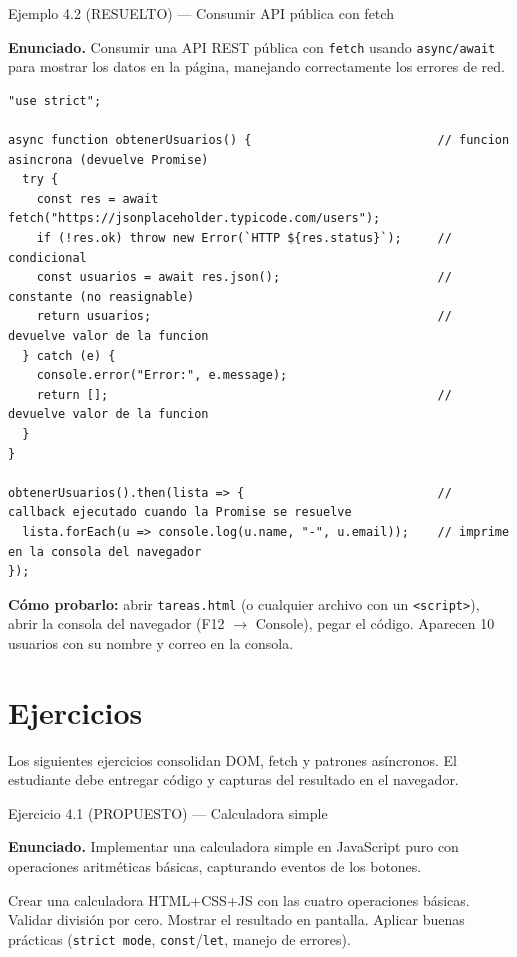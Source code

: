 \begin{cajaejemplo}{Ejemplo 4.2 (RESUELTO) --- Consumir API pública con fetch}

\textbf{Enunciado.} Consumir una API REST pública con \texttt{fetch} usando \texttt{async/await} para mostrar los datos en la página, manejando correctamente los errores de red.

\begin{lstlisting}[style=js,caption={api.js},label=lst:4.6]
"use strict";

async function obtenerUsuarios() {                          // funcion asincrona (devuelve Promise)
  try {
    const res = await fetch("https://jsonplaceholder.typicode.com/users");
    if (!res.ok) throw new Error(`HTTP ${res.status}`);     // condicional
    const usuarios = await res.json();                      // constante (no reasignable)
    return usuarios;                                        // devuelve valor de la funcion
  } catch (e) {
    console.error("Error:", e.message);
    return [];                                              // devuelve valor de la funcion
  }
}

obtenerUsuarios().then(lista => {                           // callback ejecutado cuando la Promise se resuelve
  lista.forEach(u => console.log(u.name, "-", u.email));    // imprime en la consola del navegador
});
\end{lstlisting}

\textbf{Cómo probarlo:} abrir \texttt{tareas.html} (o cualquier
archivo con un \texttt{<script>}), abrir la consola del navegador
(F12 $\rightarrow$ Console), pegar el código. Aparecen 10 usuarios
con su nombre y correo en la consola.
\end{cajaejemplo}

\section{Ejercicios}

Los siguientes ejercicios consolidan DOM, fetch y patrones
asíncronos. El estudiante debe entregar código y capturas del
resultado en el navegador.


\begin{cajaejercicio}{Ejercicio 4.1 (PROPUESTO) --- Calculadora simple}


\textbf{Enunciado.} Implementar una calculadora simple en JavaScript puro con operaciones aritméticas básicas, capturando eventos de los botones.

Crear una calculadora HTML+CSS+JS con las cuatro operaciones básicas.
Validar división por cero. Mostrar el resultado en pantalla. Aplicar
buenas prácticas (\texttt{strict mode}, \texttt{const}/\texttt{let},
manejo de errores).
\end{cajaejercicio}

